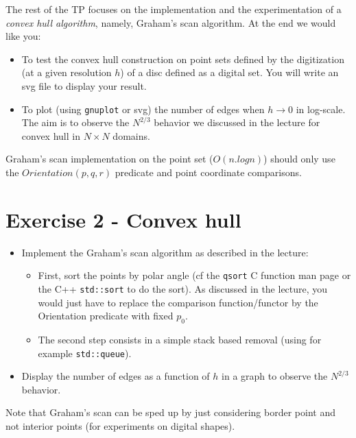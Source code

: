 \documentclass[a4paper, 11pt]{article}
\begin{document}
\par The rest of the TP focuses on the implementation and the experimentation of a \emph{convex hull algorithm}, namely, Graham's scan algorithm. At the end we would like you:
	\begin{itemize}
	\item To test the convex hull construction on point sets defined by the digitization (at a given resolution $h$) of a disc defined as a digital set. You will write an svg file to display your result.
	\item To plot (using \texttt{gnuplot} or svg) the number of edges when $h\rightarrow 0$ in log-scale. The aim is to observe the $N^{2/3}$ behavior we discussed in the lecture for convex hull in $N\times N$ domains.
	\end{itemize}


\par Graham's scan implementation on the point set ($O(n.logn)$) should only use the $Orientation(p,q,r)$ predicate and point coordinate comparisons.


\section*{Exercise 2 - \rm Convex hull}

\begin{itemize}
	\item Implement the Graham's scan algorithm as described in the lecture:
		\begin{itemize}
		\item First, sort the points by polar angle (cf the \texttt{qsort} C function man page  or the C++ \texttt{std::sort} to do the sort). As discussed in the lecture, you would just have to replace the comparison function/functor by the Orientation predicate with fixed $p_0$.
		\item The second step consists in a simple stack based removal (using for example \texttt{std::queue}).
		\end{itemize}
	\item Display the number of edges as a function of $h$ in a graph to observe the $N^{2/3}$ behavior.
\end{itemize}

\par Note that Graham's scan can be sped up by just considering border point and not interior points (for experiments on digital shapes).
\end{document}
